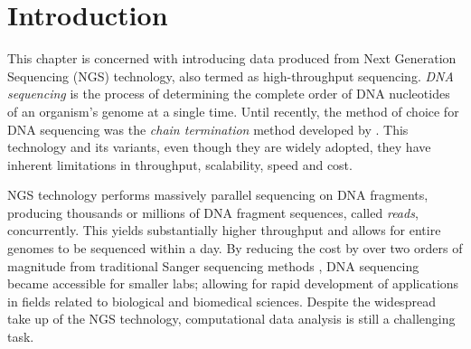 \section{Introduction} \label{data-intro-sect}
This chapter is concerned with introducing data produced from Next Generation Sequencing (NGS) technology, also termed as high-throughput sequencing. \emph{DNA sequencing} is the process of determining the complete order of DNA nucleotides of an organism's genome at a single time. Until recently, the method of choice for DNA sequencing was the \emph{chain termination} method developed by \citet{Sanger1977}. This technology and its variants, even though they are widely adopted, they have inherent limitations in throughput, scalability, speed and cost. 

NGS technology \citep{Shendure2008, Mardis2008} performs massively parallel sequencing on DNA fragments, producing thousands or millions of DNA fragment sequences, called \emph{reads}, concurrently. This yields substantially higher throughput and allows for entire genomes to be sequenced within a day. By reducing the cost by over two orders of magnitude from traditional Sanger sequencing methods \citep{Shendure2008}, DNA sequencing became accessible for smaller labs; allowing for rapid development of applications in fields related to biological and biomedical sciences. Despite the widespread take up of the NGS technology, computational data analysis is still a challenging task.
